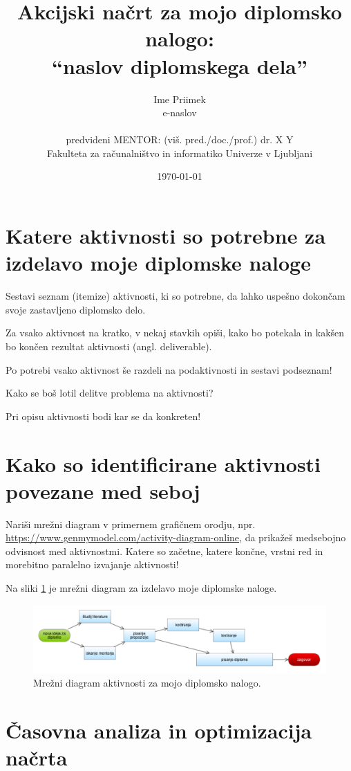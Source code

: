 \documentclass[11pt,a4paper]{article}
\title{Akcijski načrt za mojo diplomsko nalogo:\\
``naslov diplomskega dela''}
\author{Ime Priimek\\
e-naslov\\
\ \\
predvideni MENTOR: (viš. pred./doc./prof.) dr. X Y \\
Fakulteta za računalništvo in informatiko Univerze v Ljubljani
\date{\today}         
}
\begin{document}
\maketitle

\section{Katere aktivnosti so potrebne za izdelavo moje diplomske naloge}

Sestavi seznam (itemize) aktivnosti, ki so potrebne, da lahko uspešno dokončam svoje zastavljeno diplomsko delo.

Za vsako aktivnost na kratko, v nekaj stavkih opiši, kako bo potekala in kakšen bo končen rezultat aktivnosti (angl. deliverable).

Po potrebi vsako aktivnost še razdeli na podaktivnosti in sestavi podseznam!

Kako se boš lotil delitve problema na aktivnosti?

Pri opisu aktivnosti bodi kar se da konkreten!





\section{Kako so identificirane aktivnosti povezane med seboj}

Nariši mrežni diagram v primernem grafičnem orodju, npr. \url{https://www.genmymodel.com/activity-diagram-online},
da prikažeš medsebojno odvisnost med aktivnostmi. Katere so začetne, katere končne, vrstni red in morebitno paralelno izvajanje aktivnosti!


Na sliki \ref{sl:mreza} je mrežni diagram za izdelavo moje diplomske naloge.

\begin{figure}[htb]
\centerline{\includegraphics[width=1.0\textwidth]{mreza.pdf}}
\caption{Mrežni diagram aktivnosti za mojo diplomsko nalogo.}
\label{sl:mreza}
\end{figure}


\section{Časovna analiza in optimizacija načrta}
\end{document}
